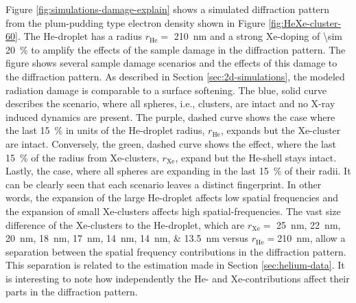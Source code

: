 Figure \ref{fig:simulations-damage-explain} shows a simulated diffraction pattern from the plum-pudding type electron density shown in Figure \ref{fig:HeXe-cluster-60}. The He-droplet has a radius $r_{\text{He}}=$ \SI{210}{\nano\meter} and a strong Xe-doping of \SI{\sim 20}{\percent} to amplify the effects of the sample damage in the diffraction pattern. The figure shows several sample damage scenarios and the effects of this damage to the diffraction pattern. As described in Section \ref{sec:2d-simulations}, the modeled radiation damage is comparable to a surface softening. The blue, solid curve describes the scenario, where all spheres, i.e., clusters, are intact and no X-ray induced dynamics are present. The purple, dashed curve shows the case where the last \SI{15}{\percent} in units of the He-droplet radius, $r_{\text{He}}$, expands but the Xe-cluster are intact. Conversely, the green, dashed curve shows the effect, where the last \SI{15}{\percent} of the radius from Xe-clusters, $r_{\text{Xe}}$, expand but the He-shell stays intact. Lastly, the case, where all spheres are expanding in the last \SI{15}{\percent} of their radii. It can be clearly seen that each scenario leaves a distinct fingerprint. In other words, the expansion of the large He-droplet affects low spatial frequencies and the expansion of small Xe-clusters affects high spatial-frequencies.
The vast size difference of the Xe-clusters to the He-droplet, which are $r_{\text{Xe}}=$ \SIlist{25;22;20;18;17;14;14;13.5}{\nano\meter} versus $r_{\text{He}}=$\SI{210}{\nano\meter}, allow a separation between the spatial frequency contributions in the diffraction pattern. This separation is related to the estimation made in Section \ref{sec:helium-data}. It is interesting to note how independently the He- and Xe-contributions affect their parts in the diffraction pattern. 
